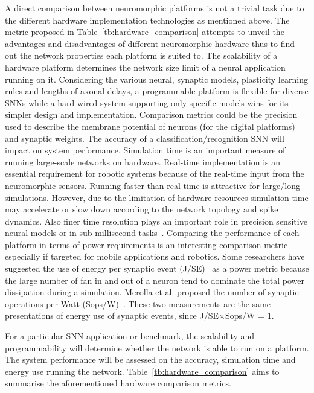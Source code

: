 A direct comparison between neuromorphic platforms is not a trivial task due to the different hardware implementation technologies as mentioned above.
The metric proposed in Table~\ref{tb:hardware_comparison} attempts to unveil the advantages and disadvantages of different neuromorphic hardware thus to find out the network properties each platform is suited to.
The scalability of a hardware platform determines the network size limit of a neural application running on it.
Considering the various neural, synaptic models, plasticity learning rules and lengths of axonal delays, a programmable platform is flexible for diverse SNNs while a hard-wired system supporting only specific models wins for its simpler design and implementation.
Comparison metrics could be the precision used to describe the membrane potential of neurons (for the digital platforms) and synaptic weights.
The accuracy of a classification/recognition SNN will impact on system performance.
Simulation time is an important measure of running large-scale networks on hardware.
Real-time implementation is an essential requirement for robotic systems because of the real-time input from the neuromorphic sensors.
Running faster than real time is attractive for large/long simulations.
However, due to the limitation of hardware resources simulation time may accelerate or slow down according to the network topology and spike dynamics.
Also finer time resolution plays an important role in precision sensitive neural models or in sub-millisecond tasks~\citep{lagorce2015breaking}.
Comparing the performance of each platform in terms of power requirements is an interesting comparison metric especially if targeted for mobile applications and robotics. Some researchers have suggested the use of energy per synaptic event (J/SE)~\citep{sharp2012power,stromatias2013power} as a power metric because the large number of fan in and out of a neuron tend to dominate the total power dissipation during a simulation. Merolla et al. proposed the number of synaptic operations per Watt (Sops/W)~\citep{merolla2014million}.
These two measurements are the same presentations of energy use of synaptic events, since J/SE$\times$Sops/W = 1. 

For a particular SNN application or benchmark, the scalability and programmability will determine whether the network is able to run on a platform.
The system performance will be assessed on the accuracy, simulation time and energy use running the network. 
Table~\ref{tb:hardware_comparison} aims to summarise the aforementioned hardware comparison metrics.
 
